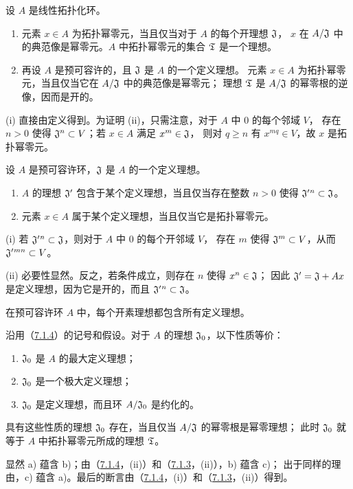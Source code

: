 设 $A$ 是线性拓扑化环。
\begin{enumerate}[label=(\roman*)]
\item 元素 $x\in A$ 为拓扑幂零元，当且仅当对于 $A$ 的每个开理想 $\mathfrak J$，
$x$ 在 $A/\mathfrak J$ 中的典范像是幂零元。$A$ 中拓扑幂零元的集合 $\mathfrak T$ 是一个理想。
\item 再设 $A$ 是预可容许的，且 $\mathfrak J$ 是 $A$ 的一个定义理想。
元素 $x\in A$ 为拓扑幂零元，当且仅当它在 $A/\mathfrak J$ 中的典范像是幂零元；
理想 $\mathfrak T$ 是 $A/\mathfrak J$ 的幂零根的逆像，因而是开的。
\end{enumerate}

(i) 直接由定义得到。为证明 (ii)，只需注意，对于 $A$ 中 $0$ 的每个邻域 $V$，
存在 $n>0$ 使得 $\mathfrak J^n\subset V$；若 $x\in A$ 满足 $x^m\in\mathfrak J$，
则对 $q\geq n$ 有 $x^{mq}\in V$，故 $x$ 是拓扑幂零元。

设 $A$ 是预可容许环，$\mathfrak J$ 是 $A$ 的一个定义理想。
\begin{enumerate}[label=(\roman*)]
\item $A$ 的理想 $\mathfrak J'$ 包含于某个定义理想，当且仅当存在整数 $n>0$ 使得
$\mathfrak J'{}^n\subset\mathfrak J$。
\item 元素 $x\in A$ 属于某个定义理想，当且仅当它是拓扑幂零元。
\end{enumerate}

(i) 若 $\mathfrak J'{}^n\subset\mathfrak J$，则对于 $A$ 中 $0$ 的每个开邻域 $V$，
存在 $m$ 使得 $\mathfrak J^m\subset V$，从而 $\mathfrak J'{}^{mn}\subset V$。

(ii) 必要性显然。反之，若条件成立，则存在 $n$ 使得 $x^n\in\mathfrak J$；
因此 $\mathfrak J'=\mathfrak J+Ax$ 是定义理想，因为它是开的，而且 $\mathfrak J'{}^n\subset\mathfrak J$。

在预可容许环 $A$ 中，每个开素理想都包含所有定义理想。

沿用（\hyperlink{para:0:7.1.4}{7.1.4}）的记号和假设。对于 $A$ 的理想 $\mathfrak J_0$，以下性质等价：
\begin{enumerate}[label=\alph*)]
\item $\mathfrak J_0$ 是 $A$ 的最大定义理想；
\item $\mathfrak J_0$ 是一个极大定义理想；
\item $\mathfrak J_0$ 是定义理想，而且环 $A/\mathfrak J_0$ 是约化的。
\end{enumerate}
具有这些性质的理想 $\mathfrak J_0$ 存在，当且仅当 $A/\mathfrak J$ 的幂零根是幂零理想；
此时 $\mathfrak J_0$ 就等于 $A$ 中拓扑幂零元所成的理想 $\mathfrak T$。

显然 a) 蕴含 b)；由（\hyperlink{para:0:7.1.4}{7.1.4}，(ii)）和（\hyperlink{para:0:7.1.3}{7.1.3}，(ii)），b) 蕴含 c)；
出于同样的理由，c) 蕴含 a)。最后的断言由（\hyperlink{para:0:7.1.4}{7.1.4}，(i)）和（\hyperlink{para:0:7.1.3}{7.1.3}，(ii)）得到。

